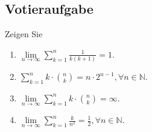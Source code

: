 \documentclass[a4paper]{article}
\begin{document}
\subsection{Votieraufgabe}
Zeigen Sie
\begin{enumerate}[label=(\alph*)]
    \item $\lim\limits_{n\to\infty}\sum\limits^n_{k=1}\frac{1}{k(k+1)}=1$.
    \bigskip
    \item $\sum\limits^n_{k=1}k\cdot \binom{n}{k}=n\cdot 2^{n-1}, \forall n\in \mathbb{N}$.
    \bigskip
    \item $\lim\limits_{n\to\infty}\sum\limits^n_{k=1}k\cdot \binom{n}{k}=\infty$.
    \bigskip
    \item $\lim\limits_{n\to\infty}\sum\limits^n_{k=1}\frac{k}{n^2}=\frac{1}{2}, \forall n\in\mathbb{N}$.
    \bigskip
\end{enumerate}
\end{document}
